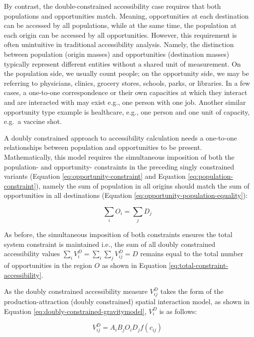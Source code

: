 \documentclass[
11pt, %
oneside, %
english, %
singlespacing, %
]{macthesis} %
\begin{document}
By contrast, the double-constrained accessibility case requires that both populations and opportunities match. Meaning, opportunities at each destination can be accessed by all populations, while at the same time, the population at each origin can be accessed by all opportunities. However, this requirement is often unintuitive in traditional accessibility analysis. Namely, the distinction between population (origin masses) and opportunities (destination masses) typically represent different entities without a shared unit of measurement. On the population side, we usually count people; on the opportunity side, we may be referring to physicians, clinics, grocery stores, schools, parks, or libraries. In a few cases, a one-to-one correspondence or their own capacities at which they interact and are interacted with may exist e.g., one person with one job. Another similar opportunity type example is healthcare, e.g., one person and one unit of capacity, e.g.~a vaccine shot.

A doubly constrained approach to accessibility calculation needs a one-to-one relationships between population and opportunities to be present. Mathematically, this model requires the simultaneous imposition of both the population- and opportunity- constraints in the preceding singly constrained variants (Equation \ref{eq:opportunity-constraint} and Equation \ref{eq:population-constraint}), namely the sum of population in all origins should match the sum of opportunities in all destinations (Equation \ref{eq:opportunity-population-equality}):

\begin{equation}
\label{eq:opportunity-population-equality}
\sum_i O_i = \sum_j D_j
\end{equation} 

As before, the simultaneous imposition of both constraints ensures the total system constraint is maintained i.e., the sum of all doubly constrained accessibility values \(\sum_i V^D_{i} = \sum_i\sum_j  V^D_{ij} = D\) remains equal to the total number of opportunities in the region \(O\) as shown in Equation \ref{eq:total-constraint-accessibility}.

As the doubly constrained accessibility measure \(V_{ij}^D\) takes the form of the production-attraction (doubly constrained) spatial interaction model, as shown in Equation \ref{eq:doubly-constrained-gravitymodel}, \(V_{i}^D\) is as follows:

\begin{equation}
\label{eq:doubly-constrained-accessibility}
V_{ij}^D = A_i B_j O_i D_j f(c_{ij})
\end{equation} 
\end{document}
